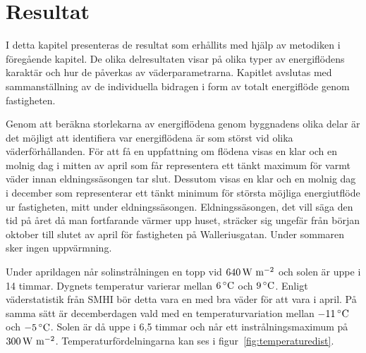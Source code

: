 \chapter{Resultat}

I detta kapitel presenteras de resultat som erhållits med hjälp av metodiken i föregående kapitel. De olika delresultaten visar på olika typer av energiflödens karaktär och hur de påverkas av väderparametrarna. Kapitlet avslutas med sammanställning av de individuella bidragen i form av totalt energiflöde genom fastigheten.

Genom att beräkna storlekarna av energiflödena genom byggnadens olika delar är det möjligt att identifiera var energiflödena är som störst vid olika väderförhållanden. För att få en uppfattning om flödena visas en klar och en molnig dag i mitten av april som får representera ett tänkt maximum för varmt väder innan eldningssäsongen tar slut. Dessutom visas en klar och en molnig dag i december som representerar ett tänkt minimum för största möjliga energiutflöde ur fastigheten, mitt under eldningssäsongen. Eldningssäsongen, det vill säga den tid på året då man fortfarande värmer upp huset, sträcker sig ungefär från början oktober till slutet av april för fastigheten på Walleriusgatan. Under sommaren sker ingen uppvärmning.

Under aprildagen når solinstrålningen en topp vid $\unit[640]{W~m^{-2}}$ och solen är uppe i 14 timmar. Dygnets temperatur varierar mellan $\unit[6]{^\circ C}$ och $\unit[9]{^\circ C}$. Enligt väderstatistik från SMHI\cite{SMHIdata} bör detta vara en med bra väder för att vara i april. På samma sätt är decemberdagen vald med en temperaturvariation mellan $\unit[-11]{^\circ C}$  och $\unit[-5]{^\circ C}$. Solen är då uppe i 6,5 timmar och når ett instrålningsmaximum på $\unit[300]{W~m^{-2}}$. Temperatur\-fördelningarna kan ses i figur~\ref{fig:temperaturedist}. 










